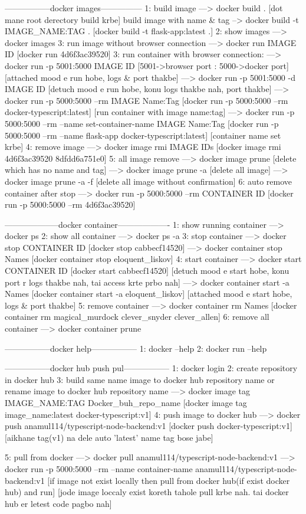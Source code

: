 -----------------docker images---------------
1: build image ---> docker build . [dot mane root derectory build krbe]
    build image with name & tag --> docker build -t IMAGE_NAME:TAG . [docker build -t flask-app:latest .]
2: show images ---> docker images
3: run image without browser connection ---> docker run IMAGE ID [docker run 4d6f3ac39520]
3: run container with browser connection:
---> docker run -p 5001:5000 IMAGE ID [5001->browser port : 5000->docker port] [attached mood e run hobe, logs & port thakbe]
---> docker run -p 5001:5000 -d IMAGE ID [detuch mood e run hobe, konu logs thakbe nah, port thakbe]
---> docker run -p 5000:5000 --rm IMAGE Name:Tag [docker run -p 5000:5000 --rm docker-typescript:latest] [run container with image name:tag]
---> docker run -p 5000:5000 --rm --name set-container-name IMAGE Name:Tag [docker run -p 5000:5000 --rm --name flask-app docker-typescript:latest] [container name set krbe]
4: remove image ---> docker image rmi IMAGE IDs [docker image rmi 4d6f3ac39520 8dfdd6a751e0]
5: all image remove 
---> docker image prune [delete which has no name and tag]
---> docker image prune -a [delete all image]
---> docker image prune -a -f [delete all image without confirmation]
6: auto remove container after stop 
---> docker run -p 5000:5000 --rm CONTAINER ID [docker run -p 5000:5000 --rm 4d6f3ac39520]



--------------------docker container-------------------
1: show running container ---> docker ps
2: show all container ---> docker ps -a
3: stop container 
---> docker stop CONTAINER ID [docker stop cabbecf14520]
---> docker container stop Names [docker container stop eloquent_liskov]
4: start container 
---> docker start CONTAINER ID [docker start cabbecf14520] [detuch mood e start hobe, konu port r logs thakbe nah, tai access krte prbo nah]
---> docker container start -a Names [docker container start -a eloquent_liskov] [attached mood e start hobe, logs & port thakbe]
5: remove container 
---> docker container rm Names [docker container rm magical_murdock clever_snyder clever_allen]
6: remove all container
---> docker container prune

-----------------docker help-----------------
1: docker --help
2: docker run --help


-----------------docker hub push pul-----------------
1: docker login
2: create repository in docker hub
3: build same name image to docker hub repository name
 or rename image to docker hub repository name ---> docker image tag IMAGE_NAME:TAG Docker_buh_repo_name [docker image tag image_name:latest  docker-typescript:v1]
4: push image to docker hub ---> docker push anamul114/typescript-node-backend:v1 [docker push docker-typescript:v1] [aikhane tag(v1) na dele auto 'latest' name tag bose jabe]

5: pull from docker
---> docker pull anamul114/typescript-node-backend:v1 
---> docker run -p 5000:5000 --rm --name container-name anamul114/typescript-node-backend:v1 [if image not exist locally then pull from docker hub(if exist docker hub) and run] [jode image loccaly exist koreth tahole pull krbe nah. tai docker hub er letest code pagbo nah]